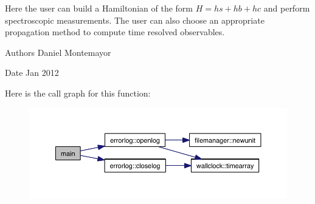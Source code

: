 Here the user can build a Hamiltonian of the form $H=hs+hb+hc$ and perform spectroscopic measurements. The user can also choose an appropriate propagation method to compute time resolved observables. \begin{DoxyAuthor}{Authors}
Daniel Montemayor
\end{DoxyAuthor}
\begin{DoxyDate}{Date}
Jan 2012 
\end{DoxyDate}
Here is the call graph for this function\+:\nopagebreak
\begin{figure}[H]
\begin{center}
\leavevmode
\includegraphics[width=350pt]{share_2examples_2fmo_2system__driver_8f90_a8ec2266d83cd6c0b762cbcbc92c0af3d_cgraph}
\end{center}
\end{figure}
